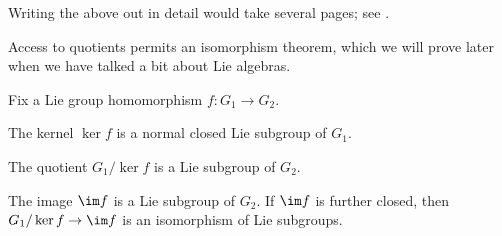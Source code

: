 \documentclass[../notes.tex]{subfiles}
\begin{document}
\begin{remark}
	Writing the above out in detail would take several pages; see \cite[Theorem~21.10]{lee-manifolds}.
\end{remark}
Access to quotients permits an isomorphism theorem, which we will prove later when we have talked a bit about Lie algebras.
\begin{theorem}[Isomorphism] \label{thm:isomorphism}
	Fix a Lie group homomorphism $f\colon G_1\to G_2$.
	\begin{listalph}
		\item The kernel $\ker f$ is a normal closed Lie subgroup of $G_1$.
		\item The quotient $G_1/\ker f$ is a Lie subgroup of $G_2$.
		\item The image $\im f$ is a Lie subgroup of $G_2$. If $\im f$ is further closed, then $G_1/\ker f\to\im f$ is an isomorphism of Lie subgroups.
	\end{listalph}
\end{theorem}
\end{document}
